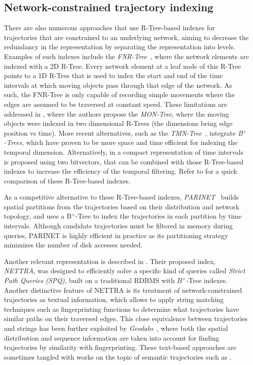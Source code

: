\documentclass[a4paper,10pt,twoside]{book}
\begin{document}
	\subsection{Network-constrained trajectory indexing}
	There are also numerous approaches that use \mbox{R-Tree-based} indexes for trajectories that are constrained to an underlying network, aiming to decrease the redundancy in the representation by separating the representation into levels. Examples of such indexes include the {\em FNR-Tree}~\cite{DBLP:conf/ssd/Frentzos03}, where the network elements are indexed with a 2D R-Tree. Every network element at a leaf node of this R-Tree points to a 1D R-Tree that is used to index the start and end of the time intervals at which moving objects pass through that edge of the network. As such, the FNR-Tree is only capable of recording simple movements where the edges are assumed to be traversed at constant speed. These limitations are addressed in \cite{DBLP:journals/geoinformatica/AlmeidaG05}, where the authors propose the {\em MON-Tree}, where the moving objects were indexed in two dimensional R-Trees (the dimensions being edge position vs time). More recent alternatives, such as the {\em TMN-Tree}~\cite{chang2010tmn}, integrate {\em B$^+$-Trees}, which have proven to be more space and time efficient for indexing the temporal dimension. Alternatively, in \cite{rivera2018faster} a compact representation of time intervals is proposed using two bitvectors, that can be combined with those \mbox{R-Tree-based} indexes to increase the efficiency of the temporal filtering. Refer to \cite{john2017performance} for a quick comparison of these \mbox{R-Tree-based} indexes.

    As a competitive alternative to these \mbox{R-Tree-based} indexes, {\em PARINET}~\cite{DBLP:journals/vldb/PopaZOBV11} builds spatial partitions from the trajectories based on their distribution and network topology, and uses a B$^+$-Tree to index the trajectories in each partition by time intervals. Although candidate trajectories must be filtered in memory during queries, PARINET is highly efficient in practice as its partitioning strategy minimizes the number of disk accesses needed.
    
    Another relevant representation is described in \cite{DBLP:conf/gis/KroghPTT14}. Their proposed index, {\em NETTRA}, was designed to efficiently solve a specific kind of queries called {\em Strict Path Queries (SPQ)}, built on a traditional RDBMS with $B^+$-Tree indexes. Another distinctive feature of NETTRA is its treatment of \mbox{network-constrained} trajectories as textual information, which allows to apply string matching techniques such as fingerprinting functions to determine what trajectories have similar paths on their traversed edges. This close equivalence between trajectories and strings has been further exploited by \textit{Geodabs}~\cite{chapuis2018geodabs}, where both the spatial distribution and sequence information are taken into account for finding trajectories by similarity with fingerprinting. These text-based approaches are sometimes tangled with works on the topic of semantic trajectories such as \cite{al2017semantictraj}.
    
\end{document}
